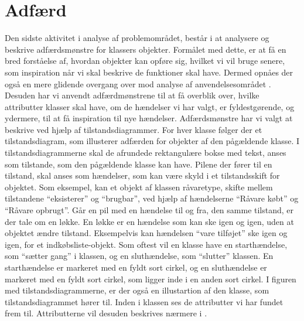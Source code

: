 \section{Adfærd}
\label{sec:adfaerd}

Den sidste aktivitet i analyse af problemområdet, består i at analysere og beskrive adfærdsmønstre for klassers objekter. Formålet med dette, er at få en bred forståelse af, hvordan objekter kan opføre sig, hvilket vi vil bruge senere, som inspiration når vi skal beskrive de funktioner \Foodl{} skal have. Dermed opnåes der også en mere glidende overgang over mod analyse af anvendelsesområdet . Desuden har vi anvendt adfærdmønstrene til at få overblik over, hvilke attributter klasser skal have, om de hændelser vi har valgt, er fyldestgørende, og ydermere, til at få inspiration til nye hændelser. Adfærdsmønstre har vi valgt at beskrive ved hjælp af tilstandsdiagrammer. For hver klasse følger der et tilstandsdiagram, som illusterer adfærden for objekter af den pågældende klasse. I tilstandsdiagrammerne skal de afrundede rektangulære bokse med tekst, anses som tilstande, som den pågældende klasse kan have. Pilene der fører til en tilstand, skal anses som hændelser, som kan være skyld i et tilstandsskift for objektet. Som eksempel, kan et objekt af klassen råvaretype, skifte mellem tilstandene ``eksisterer'' og ``brugbar'', ved hjælp af hændelserne ``Råvare købt'' og ``Råvare opbrugt''. Går en pil med en hændelse til og fra, den samme tilstand, er der tale om en løkke. En løkke er en hændelse som kan ske igen og igen, uden at objektet ændre tilstand. Eksempelvis kan hændelsen ``vare tilføjet'' ske igen og igen, for et indkøbsliste-objekt. Som oftest vil en klasse have en starthændelse, som ``sætter gang'' i klassen, og en sluthændelse, som ``slutter'' klassen. En starthændelse er markeret med en fyldt sort cirkel, og en sluthændelse er markeret med en fyldt sort cirkel, som ligger inde i en anden sort cirkel. I figuren med tilstandsdiagrammerne, er der også en illustartion af den klasse, som tilstandsdiagrammet hører til. Inden i klassen ses de attributter vi har fundet frem til. Attributterne vil desuden beskrives nærmere i  . 


%



%


